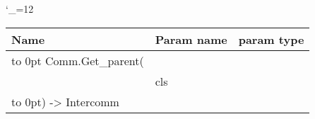 \begingroup \catcode`\_=12 \tt
\begin{tabular}{lll}
\toprule
\textrm{Name}&\textrm{Param name}&\textrm{param type}\\
\midrule
\hbox to 0pt {Comm.Get_parent(\hss}\\
& cls\\
\hbox to 0pt{) -> Intercomm\hss}\\
\bottomrule
\end{tabular}
\endgroup
